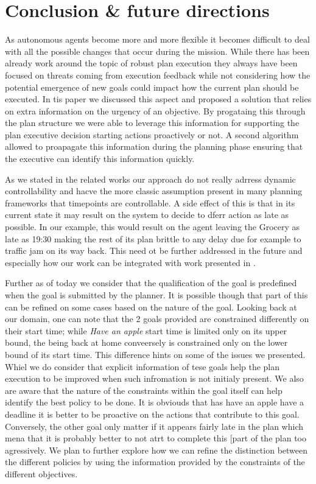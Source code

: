 
\section{Conclusion \& future directions}
\label{sec:conclude}



As autonomous agents become more and more flexible it becomes difficult to deal with all the possible changes that occur during the mission. While there has been already work around the topic of robust plan execution they always have been focused on threats coming from execution feedback while not considering how the potential emergence 
of new goals could impact how the current plan should be executed. In tis paper we discussed this aspect and proposed a solution that relies on extra information on the urgency of an objective. By progataing this through the plan structure we were able to 
leverage this information for supporting the plan executive decision starting actions proactively or not. A second algorithm allowed to proapagate this information during the planning phase ensuring that the executive can identify this information quickly. 

As we stated in the related works our approach do not really adrress dynamic 
controllability and hacve the more classic assumption present in many planning 
frameworks that timepoints are controllable. A side effect of this is that in its current state it may result on the system to decide to dferr action as late as possible. In our example, this would result on the agent leaving the Grocery as late as 19:30 making the rest of its plan brittle to any delay due for example to traffic jam on its way back. This need ot be further addressed in the future and especially how our work can be integrated with work presented in \cite{morris01}. 

Further as of today we consider that the qualification of the goal is predefined when the goal is submitted by the planner. It is possible though that part of this can be refined on some cases based on the nature  of the goal. Looking back at our domain, one can note that the 2 goals provided are constrained differently on their start time; while {\em Have an  apple} start time is limited only on its upper bound, the being back at home conveersely is constrained only on the lower bound of its start time. This difference hints on some of the issues we presented. Whiel we do consider that explicit information of tese goals help the plan execution to be improved when such infromation is not initialy present. We also are aware that the nature of the constraints within the goal itself can help identify the best policy to be done. It is obviouds that has have an apple have a deadline it is better to be proactive on the actions that contribute to this goal. Conversely, the other goal only matter if it appears fairly late in the plan which mena that it is probably better to not atrt to complete this [part of the plan too agressively. We plan to further explore how we can refine the distinction between the different policies by using the information provided by the constraints of the different objectives. 
 
